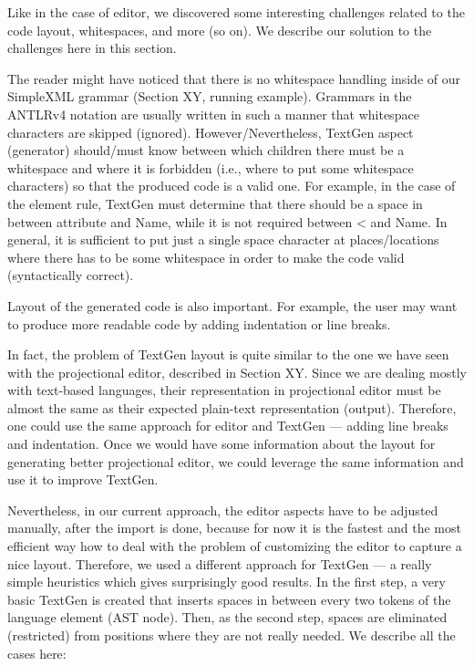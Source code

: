 \documentclass[10pt]{sigplanconf}
\newcommand{\antlrap}{\textquotesingle}
\newcommand{\antlrparserrule}[1]{\textcolor{antlrparserrulecolor}{#1}}
\newcommand{\antlrlexerrule}[1]{\textcolor{antlrlexerrulecolor}{#1}}
\newcommand{\antlrliteralnoap}[1]{\textcolor{antlrliteralcolor}{#1}}
\newcommand{\antlrliteral}[1]{\antlrap\antlrliteralnoap{#1}\antlrap}
\begin{document}
Like in the case of editor, we discovered some interesting challenges related to the code layout, whitespaces, and more (so on).
We describe our solution to the challenges here in this section.

The reader might have noticed that there is no whitespace handling inside of our SimpleXML grammar (Section XY, running example).
Grammars in the ANTLRv4 notation are usually written in such a manner that whitespace characters are skipped (ignored).
However/Nevertheless, TextGen aspect (generator) should/must know between which children there must be a whitespace and where it is forbidden (i.e., where to put some whitespace characters) so that the produced code is a valid one.
For example, in the case of the \antlrparserrule{element} rule, TextGen must determine that there should be a space in between \antlrparserrule{attribute} and \antlrlexerrule{Name}, while it is not required between \antlrliteral{\textless} and \antlrlexerrule{Name}.
In general, it is sufficient to put just a single space character at places/locations where there has to be some whitespace in order to make the code valid (syntactically correct).

Layout of the generated code is also important. For example, the user may want to produce more readable code by adding indentation or line breaks.

In fact, the problem of TextGen layout is quite similar to the one we have seen with the projectional editor, described in Section XY.
Since we are dealing mostly with text-based languages, their representation in projectional editor must be almost the same as their expected plain-text representation (output).
Therefore, one could use the same approach for editor and TextGen --- adding line breaks and indentation.
Once we would have some information about the layout for generating better projectional editor, we could leverage the same information and use it to improve TextGen.

Nevertheless, in our current approach, the editor aspects have to be adjusted manually, after the import is done, because for now it is the fastest and the most efficient way how to deal with the problem of customizing the editor to capture a nice layout.
Therefore, we used a different approach for TextGen --- a really simple heuristics which gives surprisingly good results.
In the first step, a very basic TextGen is created that inserts spaces in between every two tokens of the language element (AST node).
Then, as the second step, spaces are eliminated (restricted) from positions where they are not really needed.
We describe all the cases here:
\end{document}
